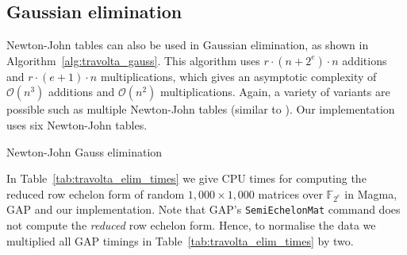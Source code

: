 \documentclass{sig-alternate}
\newcommand{\ring}[1]{\mathbb{#1}}
\newcommand{\FZE}{\ensuremath{\ring{F}_{2^e}}\xspace}
\newcommand{\ord}[1]{\ensuremath{\mathcal{O}\!\left(#1\right)}}
\begin{document}
\subsection{Gaussian elimination} \label{sec:gauss}

Newton-John tables can also be used in Gaussian elimination, as shown in Algorithm~\ref{alg:travolta_gauss}. This algorithm uses $r \cdot (n + 2^e) \cdot n$ additions and $r \cdot (e+1) \cdot n$ multiplications, which gives an asymptotic complexity of $\ord{n^3}$ additions and $\ord{n^2}$ multiplications. Again, a variety of variants are possible such as multiple Newton-John tables (similar to \cite{matmulgf2}). Our implementation uses six Newton-John tables.

\begin{algorithm}[h]
\caption{Newton-John Gauss elimination}
\label{alg:travolta_gauss}
\end{algorithm}

In Table~\ref{tab:travolta_elim_times} we give CPU times for computing the reduced row echelon form of random $1,000 \times 1,000$ matrices over \FZE in Mag\-ma, GAP and our implementation. Note that GAP's \texttt{Semi\-Ech\-elon\-Mat} command does not compute the \emph{reduced} row echelon form. Hence, to normalise the data we multiplied all GAP timings in Table~\ref{tab:travolta_elim_times} by two.
\end{document}
